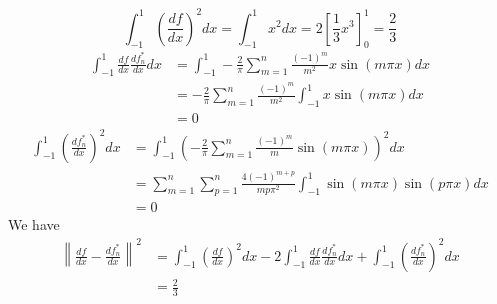\documentclass[12pt]{article}
\begin{document}
$$
\int_{-1}^1\left(\frac{df}{dx}\right)^2dx = \int_{-1}^1x^2dx =
2\left[\frac{1}{3}x^3\right]_0^1=\frac{2}{3}
$$
\begin{align*}
\int_{-1}^1\frac{df}{dx}\frac{df_n^*}{dx}dx &=
\int_{-1}^1 -\frac{2}{\pi}\sum_{m=1}^n\frac{(-1)^m}{m^2}x\sin(m\pi x)dx \\&=
-\frac{2}{\pi}\sum_{m=1}^n\frac{(-1)^m}{m^2}\int_{-1}^1x\sin(m\pi x)dx \\&=
0
\end{align*}
\begin{align*}
\int_{-1}^1\left(\frac{df_n^*}{dx}\right)^2dx &=
\int_{-1}^1\left(-\frac{2}{\pi}
\sum_{m=1}^n\frac{(-1)^m}{m}\sin(m\pi x)\right)^2dx \\&=
\sum_{m=1}^n\sum_{p=1}^n\frac{4(-1)^{m+p}}{mp\pi^2}
\int_{-1}^1\sin(m\pi x)\sin(p\pi x)dx \\&=
0
\end{align*}
We have
\begin{align*}
\left\|\frac{df}{dx}-\frac{df_n^*}{dx}\right\|^2 &=
\int_{-1}^1\left(\frac{df}{dx}\right)^2dx -
2\int_{-1}^1\frac{df}{dx}\frac{df_n^*}{dx}dx +
\int_{-1}^1\left(\frac{df_n^*}{dx}\right)^2dx \\&=
\frac{2}{3}
\end{align*}

\section{}
\end{document}
